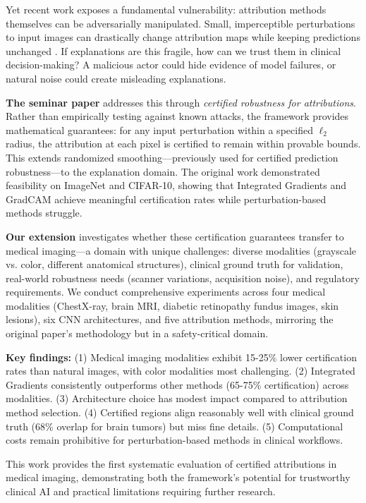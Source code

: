 \documentclass[11pt]{article}
\begin{document}
Yet recent work exposes a fundamental vulnerability: attribution methods themselves can be adversarially manipulated. Small, imperceptible perturbations to input images can drastically change attribution maps while keeping predictions unchanged \cite{ghorbani2019interpretation, dombrowski2019explanations}. If explanations are this fragile, how can we trust them in clinical decision-making? A malicious actor could hide evidence of model failures, or natural noise could create misleading explanations.

\textbf{The seminar paper} addresses this through \textit{certified robustness for attributions}. Rather than empirically testing against known attacks, the framework provides mathematical guarantees: for any input perturbation within a specified $\ell_2$ radius, the attribution at each pixel is certified to remain within provable bounds. This extends randomized smoothing—previously used for certified prediction robustness—to the explanation domain. The original work demonstrated feasibility on ImageNet and CIFAR-10, showing that Integrated Gradients and GradCAM achieve meaningful certification rates while perturbation-based methods struggle.

\textbf{Our extension} investigates whether these certification guarantees transfer to medical imaging—a domain with unique challenges: diverse modalities (grayscale vs. color, different anatomical structures), clinical ground truth for validation, real-world robustness needs (scanner variations, acquisition noise), and regulatory requirements. We conduct comprehensive experiments across four medical modalities (ChestX-ray, brain MRI, diabetic retinopathy fundus images, skin lesions), six CNN architectures, and five attribution methods, mirroring the original paper's methodology but in a safety-critical domain.

\textbf{Key findings:} (1) Medical imaging modalities exhibit 15-25\% lower certification rates than natural images, with color modalities most challenging. (2) Integrated Gradients consistently outperforms other methods (65-75\% certification) across modalities. (3) Architecture choice has modest impact compared to attribution method selection. (4) Certified regions align reasonably well with clinical ground truth (68\% overlap for brain tumors) but miss fine details. (5) Computational costs remain prohibitive for perturbation-based methods in clinical workflows.

This work provides the first systematic evaluation of certified attributions in medical imaging, demonstrating both the framework's potential for trustworthy clinical AI and practical limitations requiring further research.
\end{document}

